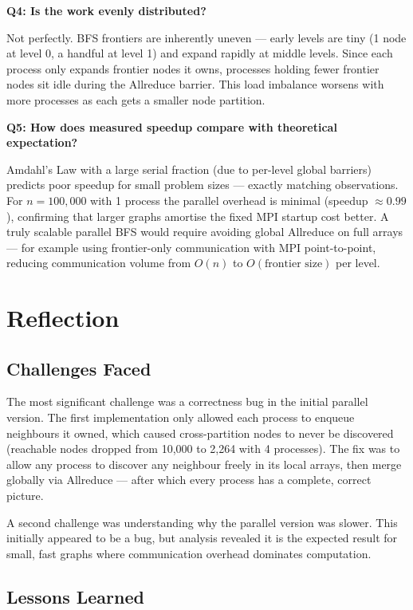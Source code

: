 \documentclass[12pt,a4paper]{article}
\begin{document}
\textbf{Q4: Is the work evenly distributed?}

Not perfectly. BFS frontiers are inherently uneven --- early levels are tiny
(1 node at level 0, a handful at level 1) and expand rapidly at middle levels.
Since each process only expands frontier nodes it owns, processes holding fewer
frontier nodes sit idle during the Allreduce barrier. This load imbalance
worsens with more processes as each gets a smaller node partition.

\textbf{Q5: How does measured speedup compare with theoretical expectation?}

Amdahl's Law with a large serial fraction (due to per-level global barriers)
predicts poor speedup for small problem sizes --- exactly matching observations.
For $n=100{,}000$ with 1 process the parallel overhead is minimal (speedup
$\approx 0.99$), confirming that larger graphs amortise the fixed MPI startup
cost better. A truly scalable parallel BFS would require avoiding global
Allreduce on full arrays --- for example using frontier-only communication with
MPI point-to-point, reducing communication volume from $O(n)$ to
$O(\text{frontier size})$ per level.

\section{Reflection}

\subsection{Challenges Faced}

The most significant challenge was a correctness bug in the initial parallel
version. The first implementation only allowed each process to enqueue
neighbours it owned, which caused cross-partition nodes to never be discovered
(reachable nodes dropped from 10,000 to 2,264 with 4 processes). The fix was
to allow any process to discover any neighbour freely in its local arrays, then
merge globally via Allreduce --- after which every process has a complete,
correct picture.

A second challenge was understanding why the parallel version was slower. This
initially appeared to be a bug, but analysis revealed it is the expected result
for small, fast graphs where communication overhead dominates computation.

\subsection{Lessons Learned}
\end{document}
